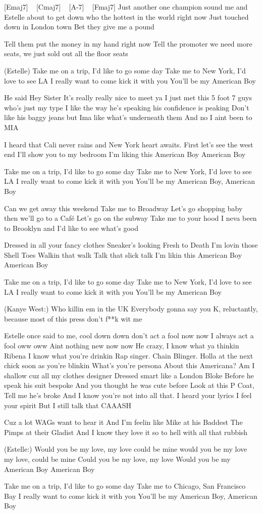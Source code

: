 [Emaj7] ~ [Cmaj7] ~ [A-7] ~ [Fmaj7]
 Just another one champion sound
me and Estelle about to get down
who the hottest in the world right now
Just touched down in London town
Bet they give me a pound

Tell them put the money in my hand right now
Tell the promoter we need more seats,
we just sold out all the floor seats

(Estelle)
Take me on a trip, I'd like to go some day
Take me to New York, I'd love to see LA
I really want to come kick it with you
You'll be my American Boy

He said Hey Sister
It's really really nice to meet ya
I just met this 5 foot 7 guys who's just my type
I like the way he's speaking his confidence is peaking
Don't like his baggy jeans but Ima like what's underneath them
And no I aint been to MIA

I heard that Cali never rains and New York heart awaits. First let's see the west end
I'll show you to my bedroom
I'm liking this American Boy
American Boy

Take me on a trip, I'd like to go some day
Take me to New York, I'd love to see LA
I really want to come kick it with you
You'll be my American Boy, American Boy

Can we get away this weekend
Take me to Broadway
Let's go shopping baby then we'll go to a Café
Let's go on the subway
Take me to your hood
I neva been to Brooklyn and I'd like to see what's good

Dressed in all your fancy clothes
Sneaker's looking Fresh to Death I'm lovin those Shell Toes
Walkin that walk
Talk that slick talk
I'm likin this American Boy
American Boy

Take me on a trip, I'd like to go some day
Take me to New York, I'd love to see LA
I really want to come kick it with you
You'll be my American Boy

(Kanye West:)
Who killin em in the UK
Everybody gonna say you K,
reluctantly, because most of this press don't f**k wit me

Estelle once said to me, cool down down
don't act a fool now now
I always act a fool oww oww
Aint nothing new now now
He crazy, I know what ya thinkin
Ribena I know what you're drinkin
Rap singer. Chain Blinger. Holla at the next chick soon as you're blinkin
What's you're persona
About this Americana?
Am I shallow cuz all my clothes designer
Dressed smart like a London Bloke
Before he speak his suit bespoke
And you thought he was cute before
Look at this P Coat, Tell me he's broke
And I know you're not into all that. I heard your lyrics I feel your spirit
But I still talk that CAAASH

Cuz a lot WAGs want to hear it
And I'm feelin like Mike at his Baddest
The Pimps at their Gladist
And I know they love it
so to hell with all that rubbish

(Estelle:)
Would you be my love, my love
could be mine would you be my love my love, could be mine
Could you be my love, my love
Would you be my American Boy
American Boy

Take me on a trip, I'd like to go some day
Take me to Chicago, San Francisco Bay
I really want to come kick it with you
You'll be my American Boy, American Boy

